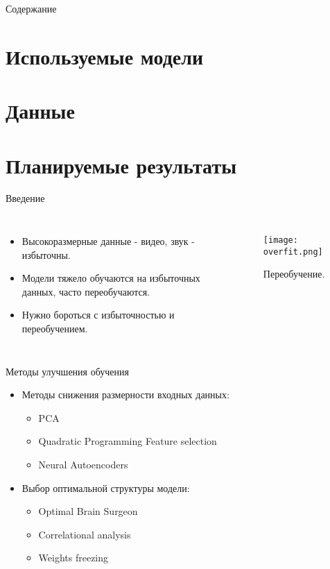 \documentclass{beamer}
\begin{document}
\begin{frame}{Содержание}
\begin{tableofcontents}
        \section{Используемые модели}
        \section{Данные}
        \section{Планируемые результаты}
        
            
    \end{tableofcontents}
\end{frame}


\begin{frame}{Введение}
\begin{columns}
\begin{itemize}
        \item Высокоразмерные данные - видео, звук - избыточны.
        \item Модели тяжело обучаются на избыточных данных, часто переобучаются.
        \item Нужно бороться с избыточностью и переобучением.
    \end{itemize}
    
    
\begin{figure}
\texttt{[image: overfit.png]}
\caption{Переобучение.}
\end{figure}

\end{columns}
\end{frame}


\begin{frame}{Методы улучшения обучения}
\begin{itemize}

    \item Методы снижения размерности входных данных:
        \begin{itemize}
            \item PCA
            \item Quadratic Programming Feature selection
            \item Neural Autoencoders
        \end{itemize}

    \item Выбор оптимальной структуры модели:
        \begin{itemize}
            \item Optimal Brain Surgeon
            \item Correlational analysis
            \item Weights freezing
        \end{itemize}
\end{itemize}
\end{frame}
\end{document}
